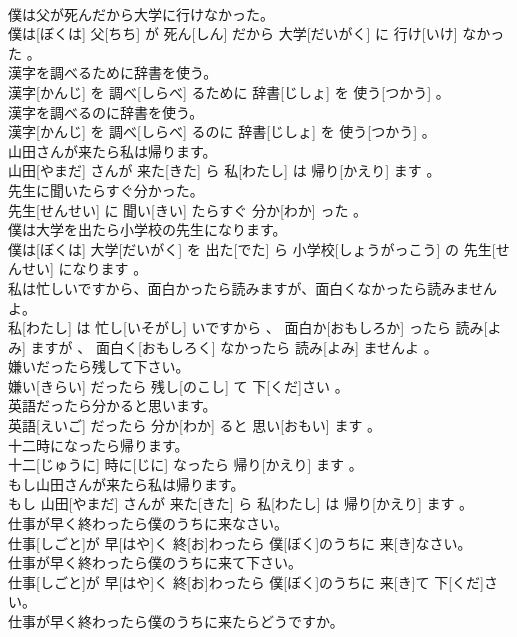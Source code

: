 \documentclass[8pt]{extreport}
\begin{document}
\begin{CJK}{UTF8}{min}
\\	僕は父が死んだから大学に行けなかった。	
\\	僕は[ぼくは] 父[ちち] が 死ん[しん] だから 大学[だいがく] に 行け[いけ] なかった 。
\\	漢字を調べるために辞書を使う。	
\\	漢字[かんじ] を 調べ[しらべ] るために 辞書[じしょ] を 使う[つかう] 。
\\	漢字を調べるのに辞書を使う。	
\\	漢字[かんじ] を 調べ[しらべ] るのに 辞書[じしょ] を 使う[つかう] 。
\\	山田さんが来たら私は帰ります。	
\\	山田[やまだ] さんが 来た[きた] ら 私[わたし] は 帰り[かえり] ます 。
\\	先生に聞いたらすぐ分かった。	
\\	先生[せんせい] に 聞い[きい] たらすぐ 分か[わか] った 。
\\	僕は大学を出たら小学校の先生になります。	
\\	僕は[ぼくは] 大学[だいがく] を 出た[でた] ら 小学校[しょうがっこう] の 先生[せんせい] になります 。
\\	私は忙しいですから、面白かったら読みますが、面白くなかったら読みませんよ。	
\\	私[わたし] は 忙し[いそがし] いですから 、 面白か[おもしろか] ったら 読み[よみ] ますが 、 面白く[おもしろく] なかったら 読み[よみ] ませんよ 。
\\	嫌いだったら残して下さい。	
\\	嫌い[きらい] だったら 残し[のこし] て 下[くだ]さい 。
\\	英語だったら分かると思います。	
\\	英語[えいご] だったら 分か[わか] ると 思い[おもい] ます 。
\\	十二時になったら帰ります。	
\\	十二[じゅうに] 時に[じに] なったら 帰り[かえり] ます 。
\\	もし山田さんが来たら私は帰ります。	
\\	もし 山田[やまだ] さんが 来た[きた] ら 私[わたし] は 帰り[かえり] ます 。
\\	仕事が早く終わったら僕のうちに来なさい。	
\\	仕事[しごと]が 早[はや]く 終[お]わったら 僕[ぼく]のうちに 来[き]なさい。
\\	仕事が早く終わったら僕のうちに来て下さい。	
\\	仕事[しごと]が 早[はや]く 終[お]わったら 僕[ぼく]のうちに 来[き]て 下[くだ]さい。
\\	仕事が早く終わったら僕のうちに来たらどうですか。	

\end{CJK}
\end{document}
